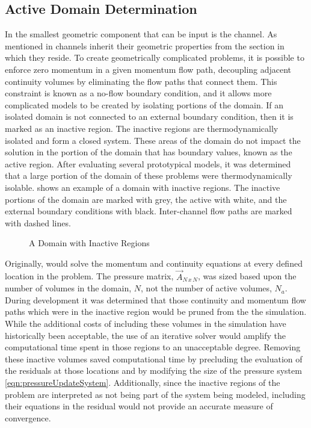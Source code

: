 \subsection{Active Domain Determination}
\label{subsect:activeDomainDetermination}
In \cobra{} the smallest geometric component that can be input is the channel.
As mentioned in  channels inherit their geometric properties from the section in which they reside.
To create geometrically complicated problems, it is possible to enforce zero momentum in a given momentum flow path, decoupling adjacent continuity volumes by eliminating the flow paths that connect them.
This constraint is known as a no-flow boundary condition, and it allows more complicated models to be created by isolating portions of the domain.
If an isolated domain is not connected to an external boundary condition, then it is marked as an inactive region.
The inactive regions are thermodynamically isolated and form a closed system.
These areas of the domain do not impact the solution in the portion of the domain that has boundary values, known as the active region.
After evaluating several prototypical models, it was determined that a large portion of the domain of these problems were thermodynamically isolable.
 shows an example of a domain with inactive regions.
The inactive portions of the domain are marked with grey, the active with white, and the external boundary conditions with black.
Inter-channel flow paths are marked with dashed lines.

\begin{figure}[ht!]
\centering

\caption{A Domain with Inactive Regions}
\label{fig:activeDomain}
\end{figure}

Originally, \cobra{} would solve the momentum and continuity equations at every defined location in the problem.
The pressure matrix, $\vec{A}_{N\,x\,N}$, was sized based upon the number of volumes in the domain, $N$, not the number of active volumes, $N_{a}$.
During development it was determined that those continuity and momentum flow paths which were in the inactive region would be pruned from the the simulation.
While the additional costs of including these volumes in the simulation have historically been acceptable, the use of an iterative solver would amplify the computational time spent in those regions to an unacceptable degree.
Removing these inactive volumes saved computational time by precluding the evaluation of the residuals at those locations and by modifying the size of the pressure system \eqref{eqn:pressureUpdateSystem}.
Additionally, since the inactive regions of the problem are interpreted as not being part of the system being modeled, including their equations in the residual would not provide an accurate measure of convergence.


